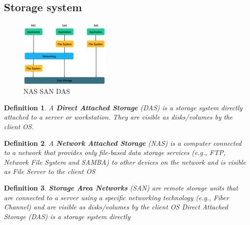 \documentclass[10pt, oneside]{article}
\newtheorem{defn}{Definition}
\begin{document}
\subsection{Storage system}
\begin{multicols}{2}
\begin{figure}[H]
    \begin{center}
    \includegraphics[width=0.4\textwidth]{img/img19.png}
    \caption{NAS SAN DAS}
    \label{fig:NAS SAN DAS}
    \end{center}
\end{figure}
\columnbreak
\begin{defn}
A {\bf Direct Attached Storage} (DAS) is a storage system directly attached to a server or workstation. They are visible as disks/volumes by the client OS.
\end{defn}
\begin{defn}
A {\bf Network Attached Storage} (NAS) is a computer connected to a network that provides only file-based data storage services (e.g., FTP, Network File System and SAMBA) to other devices on the network and is visible as File Server to the client OS
\end{defn}
\begin{defn}
{\bf Storage Area Networks} (SAN) are remote storage units that are connected to a server using a specific networking technology (e.g., Fiber Channel) and are visible as disks/volumes by the client OS
Direct Attached Storage (DAS) is a storage system directly
\end{defn}
\end{multicols}
\end{document}
